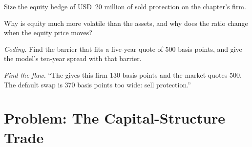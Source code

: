 \begin{exercise}[$\star\star$]\label{exo:rc:structural-credit-models:5}
Size the equity hedge of USD~20 million of sold protection on the chapter's firm.
\end{exercise}

\begin{exercise}[$\star\star$]\label{exo:rc:structural-credit-models:6}
Why is equity much more volatile than the assets, and why does the ratio change when the
equity price moves?
\end{exercise}

\begin{exercise}[$\star\star\star$]\label{exo:rc:structural-credit-models:7}
\emph{Coding.} Find the barrier that fits a five-year quote of 500 basis points, and give
the model's ten-year spread with that barrier.
\end{exercise}

\begin{exercise}[$\star\star\star$]\label{exo:rc:structural-credit-models:8}
\emph{Find the flaw.} ``The  gives this firm 130 basis points and the market
quotes 500. The default swap is 370 basis points too wide: sell protection.''
\end{exercise}

\section{Problem: The Capital-Structure Trade}

